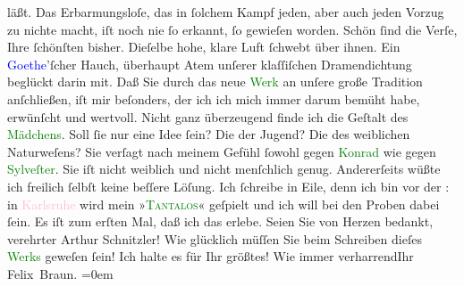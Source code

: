                     läßt. Das Erbarmungsloſe, das in ſolchem Kampf jeden, aber auch jeden Vorzug zu
                    nichte macht, iſt noch nie ſo erkannt, ſo gewieſen worden.\pend
           \pstart
           Schön ſind die Verſe, Ihre ſchönſten bisher. Dieſelbe hohe, klare Luft ſchwebt
                    über ihnen. Ein \textcolor{blue}{Goethe}{}\ledrightnote{\textcolor{blue}{Johann Wolfgang von Goethe}}’ſcher Hauch,
                    überhaupt Atem unſerer klaſſiſchen Dramendichtung {\pb}beglückt darin mit. Daß Sie durch das neue \textcolor{green}{Werk}{} an unſere große Tradition anſchließen, iſt mir
                    beſonders, der ich ich mich immer darum bemüht habe, erwünſcht und wertvoll.\pend
           \pstart
           Nicht ganz überzeugend finde ich die Geſtalt des \textcolor{green}{Mädchens}{}. Soll ſie nur eine Idee ſein? Die der
                    Jugend? Die des weiblichen Naturweſens? Sie verſagt nach meinem Gefühl ſowohl
                    gegen \textcolor{green}{Konrad}{} wie gegen \textcolor{green}{Sylveſter}{}. Sie iſt nicht
                    weiblich und nicht menſchlich genug. Andererſeits wüßte ich freilich ſelbſt
                    keine beſſere Löſung.\pend
           \pstart
           Ich ſchreibe in Eile, denn ich bin vor der \label{K_L02468_1v}\label{K_L02468_1h}: in \textcolor{pink}{Karlsruhe}{}\ledrightnote{\textcolor{pink}{Karlsruhe}} wird mein »\textcolor{green}{\textsc{Tantalos}}{}\ledrightnote{\textcolor{green}{Tantalos}}« geſpielt und ich will bei den {\pb}Proben
                    dabei ſein. Es iſt zum erſten Mal, daß ich das erlebe.\pend
           \pstart
           Seien Sie von Herzen bedankt, verehrter Arthur Schnitzler! Wie glücklich müſſen
                    Sie beim Schreiben dieſes \textcolor{green}{Werks}{} geweſen ſein! Ich halte es für Ihr größtes!\pend
           \pstart
           Wie immer verharrend\hspace*{1.5em}Ihr{\\[\baselineskip]}\spacefill\mbox{Felix Braun.}\pend
           \leftskip=0em{}\endnumbering{}  
      